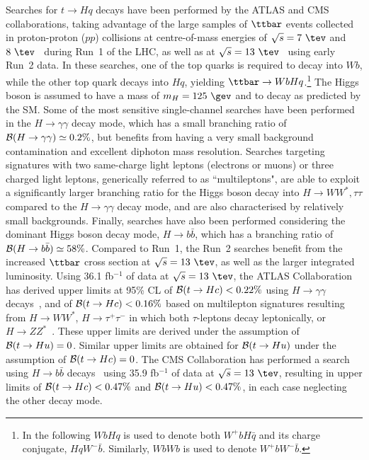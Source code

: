Searches for $t \to Hq$ decays have been performed by the ATLAS and CMS collaborations, taking advantage of the large samples
of $\ttbar$ events collected in proton-proton ($pp$) collisions at centre-of-mass energies of $\sqrt{s}=7~\tev$ and $8~\tev$~\cite{Aad:2014dya,Aad:2015pja,Khachatryan:2016atv} during Run~1 of the LHC, as well as at $\sqrt{s}=13~\tev$~\cite{Aaboud:2017mfd,Aaboud:2018pob,Sirunyan:2017uae} using early Run~2 data.
In these searches, one of the top quarks is required to decay into $Wb$, while the other top quark decays into $Hq$, yielding $\ttbar \to WbHq$.\footnote{ 
In the following $WbHq$ is used to denote both $W^+b H\bar{q}$ and its charge conjugate, $HqW^- \bar{b}$. Similarly, 
$WbWb$ is used to denote $W^+b W^- \bar{b}$.}  The Higgs boson is assumed to have a mass of $m_H=125~\gev$ and to decay as predicted by
the SM. Some of the most sensitive single-channel searches have been performed in the $H\to\gamma\gamma$ decay mode, which
has a small branching ratio of $\mathcal{B}(H\to \gamma\gamma)\simeq 0.2\%$, but benefits from having a very small background contamination 
and excellent diphoton mass re\-so\-lu\-tion. 
Searches targeting signatures with two same-charge light leptons (electrons or muons) or three charged light leptons, generically referred to as ``multileptons",
are able to exploit a significantly larger branching ratio for the Higgs 
boson decay into $H \to WW^*, \tau\tau$ compared to the $H\to\gamma\gamma$ decay mode, and are also characterised by relatively small backgrounds.
Finally, searches have also been performed considering the dominant Higgs boson decay mode, $H\to b\bar{b}$, which has a branching ratio 
of $\mathcal{B}(H\to b\bar{b})\simeq 58\%$. Compared to Run~1, the Run~2 searches benefit from the increased $\ttbar$ cross section at $\sqrt{s}=13~\tev$, 
as well as the larger integrated luminosity.
Using 36.1 fb$^{-1}$ of data at $\sqrt{s}=13~\tev$, the ATLAS Collaboration has derived upper limits at 95\% CL of  
$\mathcal{B}(t\to Hc)<0.22\%$ using $H\to \gamma\gamma$ decays~\cite{Aaboud:2017mfd}, and of $\mathcal{B}(t\to Hc)<0.16\%$ based on
multilepton signatures resulting from 
$H \to WW^*$, $H\to \tau^+\tau^-$ in which both $\tau$-leptons decay leptonically, or $H \to ZZ^*$~\cite{Aaboud:2018pob}.
These upper limits are derived under the assumption of $\mathcal{B}(t\to Hu)=0$. Similar upper limits are obtained for $\mathcal{B}(t\to Hu)$ under the
assumption of $\mathcal{B}(t\to Hc)=0$. The CMS Collaboration has performed a search using  
$H\to b\bar{b}$ decays~\cite{Sirunyan:2017uae} using 35.9 fb$^{-1}$ of data at $\sqrt{s}=13~\tev$, resulting 
in upper limits of $\mathcal{B}(t\to Hc)<0.47\%$ and $\mathcal{B}(t\to Hu)<0.47\%$, in each case neglecting the other decay mode.

